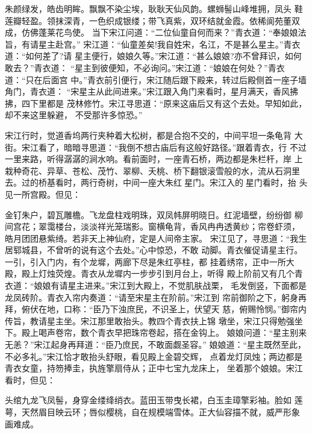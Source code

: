朱颜绿发，皓齿明眸。飘飘不染尘埃，耿耿天仙风韵。螺蛳髻山峰堆拥，凤头
鞋莲瓣轻盈。领抹深青，一色织成银缕；带飞真紫，双环结就金霞。依稀阆苑董双
成，仿佛蓬莱花鸟使。
当下宋江问道：“二位仙童自何而来？”青衣道：“奉娘娘法旨，有请星主赴宫。”
宋江道：“仙童差矣!我自姓宋，名江，不是甚么星主。”青衣道：“如何差了?请
星主便行，娘娘久等。”宋江道：“甚么娘娘?亦不曾拜识，如何敢去？”青衣道：
“星主到彼便知，不必询问。”宋江道：“娘娘在何处？”青衣道：“只在后面宫
中。”青衣前引便行，宋江随后跟下殿来，转过后殿侧首一座子墙角门，青衣道：
“宋星主从此间进来。”宋江跟入角门来看时，星月满天，香风拂拂，四下里都是
茂林修竹。宋江寻思道：“原来这庙后又有这个去处。早知如此，却不来这里躲避，
不受那许多惊恐。”

宋江行时，觉道香坞两行夹种着大松树，都是合抱不交的，中间平坦一条龟背
大街。宋江看了，暗暗寻思道：“我倒不想古庙后有这般好路径。”跟着青衣，行
不过一里来路，听得潺潺的涧水响。看前面时，一座青石桥，两边都是朱栏杆，岸
上栽种奇花、异草、苍松、茂竹、翠柳、夭桃、桥下翻银滚雪般的水，流从石洞里
去。过的桥基看时，两行奇树，中间一座大朱红星门。宋江入的星门看时，抬
头见一所宫殿。但见：

金钉朱户，碧瓦雕檐。飞龙盘柱戏明珠，双凤帏屏明晓日。红泥墙壁，纷纷御
柳间宫花；翠霭楼台，淡淡祥光笼瑞影。窗横龟背，香风冉冉透黄纱；帘卷虾须，
皓月团团悬紫绮。若非天上神仙府，定是人间帝主家。
宋江见了，寻思道：“我生居郓城县，不曾听的说有这个去处。”心中惊恐，不敢
动脚。青衣催促请星主行。一引，引入门内，有个龙墀，两廊下尽是朱红亭柱，都
挂着绣帘，正中一所大殿，殿上灯烛荧煌。青衣从龙墀内一步步引到月台上，听得
殿上阶前又有几个青衣道：“娘娘有请星主进来。”宋江到大殿上，不觉肌肤战栗，
毛发倒竖，下面都是龙凤砖阶。青衣入帘内奏道：“请至宋星主在阶前。”宋江到
帘前御阶之下，躬身再拜，俯伏在地，口称：“臣乃下浊庶民，不识圣上，伏望天
慈，俯赐怜悯。”御帘内传旨，教请星主坐。宋江那里敢抬头。教四个青衣扶上锦
墩坐，宋江只得勉强坐下。殿上喝声卷帘，数个青衣早把珠帘卷起，搭在金钩上。
娘娘问道：“星主别来无恙？”宋江起身再拜道：“臣乃庶民，不敢面觑圣容。”
娘娘道：“星主既然至此，不必多礼。”宋江恰才敢抬头舒眼，看见殿上金碧交辉，
点着龙灯凤烛；两边都是青衣女童，持笏捧圭，执旌擎扇侍从；正中七宝九龙床上，
坐着那个娘娘。宋江看时，但见：

头绾九龙飞凤髻，身穿金缕绛绡衣。蓝田玉带曳长裙，白玉圭璋擎彩袖。脸如
莲萼，天然眉目映云环；唇似樱桃，自在规模端雪体。正大仙容描不就，威严形象
画难成。

